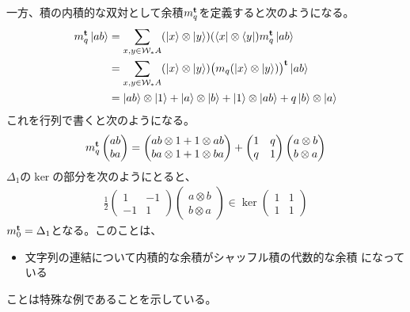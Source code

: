 {\begin{todo}[余積の性質]
		一方、積の内積的な双対として余積$m_q^{\mathbf{t}}$を定義すると次のようになる。
		\begin{equation*}\begin{split}
			m_q^{\mathbf{t}}\mathinner{|{ab}\rangle}
			&= \sum_{x,y\in {\ensuremath{{\mathcal{W}}}}_*A}(\mathinner{|{x}\rangle}\otimes\mathinner{|{y}\rangle})(\mathinner{\langle{x}|}\otimes\mathinner{\langle{y}|})
				m_q^{\mathbf{t}}\mathinner{|{ab}\rangle} \\
			&= \sum_{x,y\in {\ensuremath{{\mathcal{W}}}}_*A}(\mathinner{|{x}\rangle}\otimes\mathinner{|{y}\rangle})
				\bigl(m_q(\mathinner{|{x}\rangle}\otimes\mathinner{|{y}\rangle})\bigr)^{\mathbf{t}}\mathinner{|{ab}\rangle} \\
			&= \mathinner{|{ab}\rangle}\otimes\mathinner{|{1}\rangle} + \mathinner{|{a}\rangle}\otimes\mathinner{|{b}\rangle} 
				+ \mathinner{|{1}\rangle}\otimes \mathinner{|{ab}\rangle} + q\mathinner{|{b}\rangle}\otimes\mathinner{|{a}\rangle} \\
		\end{split}\end{equation*}
		これを行列で書くと次のようになる。
		\begin{equation*}\begin{split}
			m_q^{\mathbf{t}}\begin{pmatrix}
				ab \\ ba
			\end{pmatrix} = \begin{pmatrix}
				ab\otimes 1 + 1\otimes ab \\
				ba\otimes 1 + 1\otimes ba \\
			\end{pmatrix} + \begin{pmatrix}
				1 & q \\ q & 1
			\end{pmatrix} \begin{pmatrix}
				a\otimes b \\ b\otimes a
			\end{pmatrix}
		\end{split}\end{equation*}
		$\Delta_1$の$\ker$の部分を次のようにとると、
		\begin{equation*}\begin{split}
			\frac{1}{2} \begin{pmatrix}
				1 & -1 \\ -1 & 1
			\end{pmatrix} \begin{pmatrix}
				a\otimes b \\ b\otimes a
			\end{pmatrix}\in \ker \begin{pmatrix}
				1 & 1 \\ 1 & 1
			\end{pmatrix}
		\end{split}\end{equation*}
		$m_0^{\mathbf{t}}=\Delta_1$となる。このことは、
		\begin{itemize}\setlength{\itemsep}{-1mm} %
			\item 文字列の連結について内積的な余積がシャッフル積の代数的な余積
			になっている
		\end{itemize} %
		ことは特殊な例であることを示している。
	\end{todo} %

}
